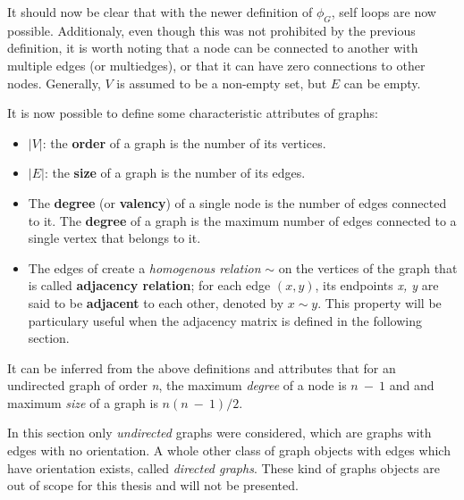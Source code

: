 \begin{definition}
It should now be clear that with the newer definition of $\phi_G$, self loops are now possible.
Additionaly, even though this was not prohibited by the previous definition, it is worth
noting that a node can be connected to another with multiple edges (or multiedges), or that it can have zero
connections to other nodes. Generally, $V$ is assumed to be a non-empty set, but $E$ can be
empty.

It is now possible to define some characteristic attributes of graphs:
\begin{itemize}
\item $|V|$: the \textbf{order} of a graph is the number of its vertices.
\item $|E|$: the \textbf{size} of a graph is the number of its edges.
\item The \textbf{degree} (or \textbf{valency}) of a single node is the number of
  edges connected to it. The \textbf{degree} of a graph is the maximum number of
  edges connected to a single vertex that belongs to it.
\item The edges of create a \textit{homogenous relation}\footnotemark{} $\sim$ on the vertices
  of the graph that is called \textbf{adjacency relation}; for each edge \textit{$(x, y)$}, its
  endpoints \textit{x, y} are said to be \textbf{adjacent} to each other, denoted by $x \sim y$.
  This property will be particulary useful when the adjacency matrix is defined in the following
  section.
\end{itemize}


It can be inferred from the above definitions and attributes that for an undirected
graph of order \textit{n}, the maximum \textit{degree} of a node is $n~-~1$ and
and maximum \textit{size} of a graph is $n(n~-~1)/2$.

\end{definition}

In this section only \textit{undirected} graphs were considered, which are graphs
with edges with no orientation. A whole other class of graph objects with edges which
have orientation exists, called \textit{directed graphs}. These kind of graphs objects
are out of scope for this thesis and will not be presented.


